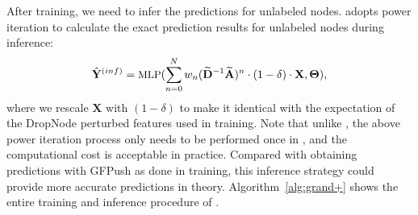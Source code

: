 
After training, we need to infer the predictions for  unlabeled nodes. \model adopts power iteration to calculate the exact prediction results for unlabeled nodes during inference:
\begin{equation}
\small
\hat{\mathbf{Y}}^{(inf)} = \text{MLP}( \sum_{n=0}^Nw_n(\widetilde{\mathbf{D}}^{-1}\widetilde{\mathbf{A}})^n \cdot (1-\delta) \cdot \mathbf{X}, \mathbf{\Theta}),
\end{equation}
where we rescale $\mathbf{X}$ with $(1 - \delta)$  to make it identical with the expectation of the DropNode perturbed features used in training. 
Note that unlike \grand, the above power iteration process only needs to be performed once in \model, and the computational cost is acceptable in practice. 
Compared with obtaining predictions with GFPush as done in training, this inference strategy could provide more accurate predictions in theory.
Algorithm~\ref{alg:grand+} shows the entire training and inference procedure of \model.











